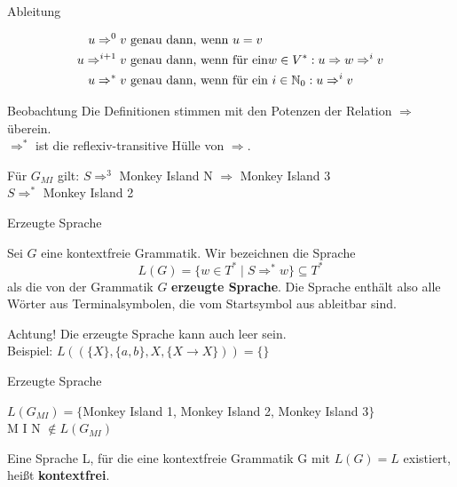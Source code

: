 \begin{frame}{Ableitung}	
	\begin{Definition}
		\begin{align*}
		u \Rightarrow^0 v &\text{ genau dann, wenn } u=v \\
		u \Rightarrow^{i+1} v &\text{ genau dann, wenn für ein}  w\in V^*: u \Rightarrow w \Rightarrow^i v\\
		u \Rightarrow^* v &\text{ genau dann, wenn für ein } i\in\mathbb{N}_0: u \Rightarrow^i v \\
		\end{align*}
	\end{Definition}
	
	\pause
	\begin{block}{Beobachtung}
		Die Definitionen stimmen mit den Potenzen der Relation $\Rightarrow$ überein.\\
		$\Rightarrow^\ast$ ist die reflexiv-transitive Hülle von $\Rightarrow$.
	\end{block}

	\pause
	\begin{Beispiel}
		Für $G_{MI}$ gilt: $S \Rightarrow^3$ Monkey Island N $\Rightarrow$ Monkey Island 3\\
		$S \Rightarrow^*$ Monkey Island 2
	\end{Beispiel}
\end{frame}


\begin{frame}{Erzeugte Sprache}
	\begin{Definition}
		Sei $G$ eine kontextfreie Grammatik. Wir bezeichnen die Sprache $$L(G) = \{w \in T^\ast \mid S \Rightarrow^\ast w \} \subseteq T^*$$ als die von der Grammatik $G$ \textbf{erzeugte Sprache}. Die Sprache enthält also alle Wörter aus Terminalsymbolen, die vom Startsymbol aus ableitbar sind.
	\end{Definition} \pause

	\begin{alertblock}{Achtung!}
		Die erzeugte Sprache kann auch leer sein. \\
		Beispiel: $L\left(\left(\{X\},\{a,b\},X,\{X\to X\}\right)\right) = \{\}$
	\end{alertblock}
\end{frame}

\begin{frame}{Erzeugte Sprache}
	\begin{Beispiel}
		$L(G_{MI}) = \{$Monkey Island 1, Monkey Island 2, Monkey Island 3$\}$\\
		M I N $\notin L(G_{MI})$
	\end{Beispiel}
	
	\pause
	\begin{Definition}
		Eine Sprache L, für die eine kontextfreie Grammatik G mit $L(G) = L$ existiert, heißt \textbf{kontextfrei}.
	\end{Definition}
		
\end{frame}


